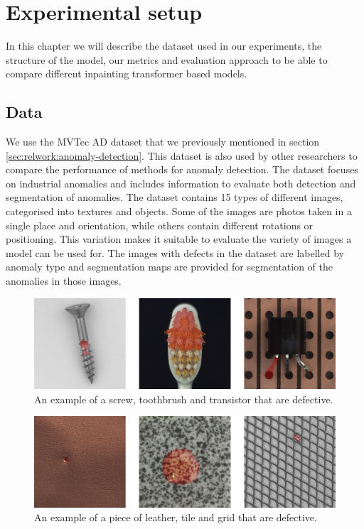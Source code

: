 \chapter{Experimental setup}\label{ch:experimental-setup}

In this chapter we will describe the dataset used in our experiments, the structure of the model, our metrics and evaluation approach to be able to compare different inpainting transformer based models.

\section{Data}
\label{sec:experimental-setup:data}

We use the MVTec AD dataset that we previously mentioned in section \ref{sec:relwork:anomaly-detection}. This dataset is also used by other researchers \cite{pirnay_inpainting_2021, bergmann_improving_2019, zavrtanik_reconstruction_2021} to compare the performance of methods for anomaly detection. The dataset focuses on industrial anomalies and includes information to evaluate both detection and segmentation of anomalies. The dataset contains 15 types of different images, categorised into textures and objects. Some of the images are photos taken in a single place and orientation, while others contain different rotations or positioning. This variation makes it suitable to evaluate the variety of images a model can be used for. The images with defects in the dataset are labelled by anomaly type and segmentation maps are provided for segmentation of the anomalies in those images.

\begin{figure}[h!]
\centering
\includegraphics[width=\textwidth]{imgs/mvtec-example-objects.jpg}
\caption{An example of a screw, toothbrush and transistor that are defective.}
\label{fig:experimental-setup:objects-example}
\end{figure}

\begin{figure}[h!]
\centering
\includegraphics[width=\textwidth]{imgs/mvtec-example-textures.jpg}
\caption{An example of a piece of leather, tile and grid that are defective.}
\label{fig:experimental-setup:textures-example}
\end{figure}


